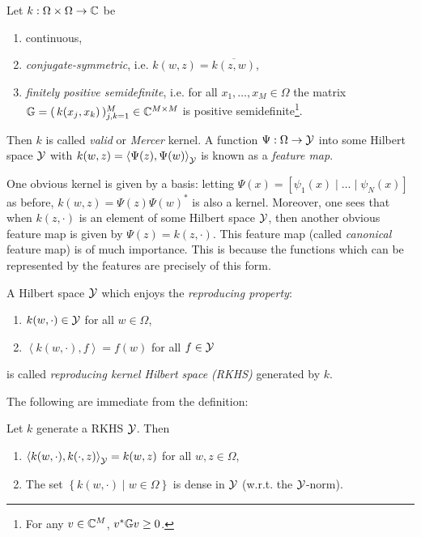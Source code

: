 \begin{definition}
    Let $k : \Omega \times \Omega \to \mathbb{C}$ be 
    \begin{enumerate}
        \item continuous,
        \item \emph{conjugate-symmetric}, i.e. $k(w, z) = \overline{k(z, w)}$,
        \item \emph{finitely positive semidefinite}, i.e. for all 
            $x_1, \ldots, x_M \in \Omega$ 
            the matrix $\mathbb{G} = (\, k(x_j, x_k) \,)_{j,k=1}^M \in \mathbb{C}^{M \times M}$ 
            is positive semidefinite\footnote{
                For any $v \in \mathbb{C}^M$, $v^* \mathbb{G} v \geq 0$. 
            }. 
    \end{enumerate}
    Then $k$ is called \emph{valid} or \emph{Mercer} kernel. 
    A function $\Psi : \Omega \to \mathcal{Y}$ into some Hilbert space $\mathcal{Y}$ with 
    $k(w, z) = \left\langle \Psi (z), \Psi (w) \right\rangle_{\mathcal{Y}}$ is known as a 
    \emph{feature map}. 
\end{definition}

One obvious kernel is given by a basis: letting 
$\Psi (x) = \left[ \psi_1 (x) \mid \ldots \mid \psi_N (x) \right]$ as before, 
$k(w, z) = \Psi (z) \Psi (w)^*$ is also a kernel. Moreover, one sees that when 
$k(z, \cdot)$ is an element of some Hilbert space $\mathcal{Y}$, then another 
obvious feature map is given by $\Psi (z) = k(z, \cdot)$. This feature map (called 
\emph{canonical} feature map) is of much importance. This is because the functions 
which can be represented by the features are precisely of this form. 

\begin{definition}
    A Hilbert space $\mathcal{Y}$ which enjoys the \emph{reproducing property}: 
    \begin{enumerate}
        \item $k (w, \cdot) \in \mathcal{Y}$ for all $w \in \Omega$,
        \item $\left\langle k(w, \cdot), f \right\rangle = f (w)$ for all 
            $f \in \mathcal{Y}$
    \end{enumerate}
    is called \emph{reproducing kernel Hilbert space (RKHS)} generated by $k$. 
\end{definition}

The following are immediate from the definition:

\begin{lemma}
    Let $k$ generate a RKHS $\mathcal{Y}$. Then
    \begin{enumerate}
        \item $\left\langle k(w, \cdot), k(\cdot, z) \right\rangle_{\mathcal{Y}} = k(w, z)$ 
            for all $w, z \in \Omega$,
        \item The set $\left\{ k(w, \cdot) \mid w \in \Omega \right\}$ is 
            dense in $\mathcal{Y}$ (w.r.t. the $\mathcal{Y}$-norm). 
    \end{enumerate}
\end{lemma}


